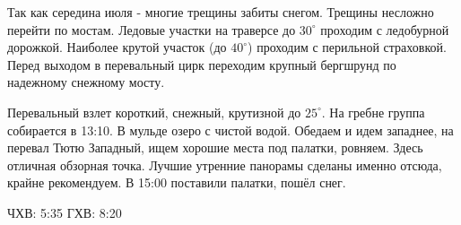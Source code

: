 Так как середина июля - многие трещины забиты снегом. Трещины несложно перейти по
мостам. Ледовые участки на траверсе до $30^\circ$ проходим с ледобурной дорожкой. Наиболее крутой участок (до $40^\circ$) проходим с перильной страховкой. Перед выходом в перевальный цирк переходим крупный бергшрунд по надежному снежному мосту.

Перевальный взлет короткий, снежный, крутизной до $25^\circ$. На гребне группа собирается в 13:10. В мульде озеро с чистой водой. Обедаем и идем западнее, на перевал Тютю Западный, ищем хорошие места под палатки, ровняем. Здесь отличная обзорная точка. Лучшие утренние панорамы сделаны именно отсюда, крайне рекомендуем. В 15:00 поставили палатки, пошёл снег.

ЧХВ: 5:35
ГХВ: 8:20















    \FloatBarrier
